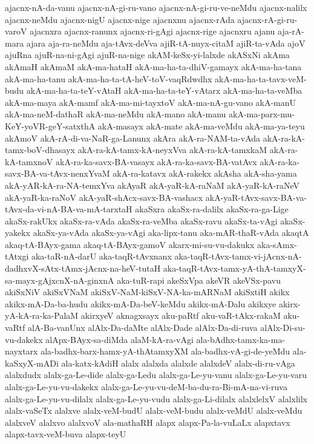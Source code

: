 {ajacnx-nA-da-vanu
ajacnx-nA-gi-ru-vano
ajacnx-nA-gi-ru-ve-neMdu
ajacnx-nalilx
ajacnx-neMdu
ajacnx-nigU
ajacnx-nige
ajacnxnu
ajacnx-rAda
ajacnx-rA-gi-ru-varoV
ajacnxra
ajacnx-ranunx
ajacnx-ri-gAgi
ajacnx-rige
ajacnxru
ajanu
aja-rA-mara
ajara
aja-ra-neMdu
aja-tAvx-deVva
ajiR-tA-nuyx-citaM
ajiR-ta-vAda
ajoV
ajuRna
ajuR-na-ni-gAgi
ajuR-na-nige
akAM-keSx-yi-lalxde
akASxNi
akAma
akAmaH
akAmaM
akA-ma-hataH
akA-ma-ha-ta-dhiV-gamayx
akA-ma-ha-tana
akA-ma-ha-tanu
akA-ma-ha-ta-tA-heV-toV-vaqRdwdhx
akA-ma-ha-ta-tavx-veM-budu
akA-ma-ha-ta-teY-vAtaH
akA-ma-ha-ta-teY-vAtarx
akA-ma-ha-ta-veMba
akA-ma-maya
akA-mamf
akA-ma-mi-tayxtoV
akA-ma-nA-gu-vano
akA-manU
akA-ma-neM-dathaR
akA-ma-neMdu
akA-mano
akA-manu
akA-ma-parx-mu-KeY-yoVR-geY-satxthA
akA-masayx
akA-mate
akA-ma-veMdu
akA-ma-ya-teyu
akAmoV
akA-rA-di-va-NaR-ga-Lanunx
akAra
akA-ra-NAM-ta-vAda
akA-ra-kA-tamx-boV-dhasayx
akA-ra-kA-tamx-kA-neyxVva
akA-ra-kA-tamxkaM
akA-ra-kA-tamxnoV
akA-ra-ka-savx-BA-vasayx
akA-ra-ka-savx-BA-vatAvx
akA-ra-ka-savx-BA-va-tAvx-nenxYvaM
akA-ra-katavx
akA-rakekx
akAsha
akA-sha-yama
akA-yAR-kA-ra-NA-temxYva
akAyaR
akA-yaR-kA-raNaM
akA-yaR-kA-raNeV
akA-yaR-ka-raNoV
akA-yaR-shAcx-savx-BA-vashacx
akA-yaR-tAvx-savx-BA-va-tAvx-da-vi-nA-BA-va-mA-tarxtaH
akaSxra
akaSx-ra-dalilx
akaSx-ra-ga-Lige
akaSx-rakUkx
akaSx-ra-vAda
akaSx-ra-veMba
akaSx-ravu
akaSx-ta-vAgi
akaSx-yakekx
akaSx-ya-vAda
akaSx-ya-vAgi
aka-lipx-tanu
aka-mAR-thaR-vAda
akaqtA
akaq-tA-BAyx-gama
akaq-tA-BAyx-gamoV
akarx-mi-su-vu-dakukx
aka-sAmx-tAtxgi
aka-taR-nA-darU
aka-taqR-tAvxnanx
aka-taqR-tAvx-tamx-vi-jAcnx-nA-dadhxvX-sAtx-tAmx-jAcnx-na-heV-tutaH
aka-taqR-tAvx-tamx-yA-thA-tamxyX-sa-mayx-gAjxcnX-nA-ginxnA
aka-tuR-rapi
akeSxVpa
akeVR
akeVSx-pavu
akiSxNiV
akiSxVNaM
akiSxV-NaM-kiSxV-NA-ka-mARNaM
akiSxtiH
akikx
akikx-mA-Da-ba-hudu
akikx-mA-Da-beV-keMdu
akikx-mA-Dalu
akikxye
akirx-yA-kA-ra-ka-PalaM
akirxyeV
aknagxsayx
aku-paRtf
aku-vaR-tAkx-rakaM
aku-vaRtf
alA-Ba-vanUnx
alAlx-Da-daMte
alAlx-Dade
alAlx-Da-di-ruva
alAlx-Di-su-vu-dakekx
alApx-BAyx-sa-diMda
alaM-kA-ra-vAgi
ala-bAdhx-tamx-ka-ma-nayxtarx
ala-badhx-barx-hamx-yA-thAtamxyXM
ala-badhx-vA-gi-de-yeMdu
ala-kaSxyX-mADi
ala-katx-kAdiH
alalx
alalxda
alalxde
alalxdeV
alalx-di-ru-vAga
alalxdudx
alalx-ga-Le-dide
alalx-ga-Ledu
alalx-ga-Le-yu-vanu
alalx-ga-Le-yu-varu
alalx-ga-Le-yu-vu-dakekx
alalx-ga-Le-yu-vu-deM-ba-du-ra-Bi-mA-na-vi-ruva
alalx-ga-Le-yu-vu-dilalx
alalx-ga-Le-yu-vudu
alalx-ga-Li-dilalx
alalxlelxV
alalxlilx
alalx-vaSeTx
alalxve
alalx-veM-budU
alalx-veM-budu
alalx-veMdU
alalx-veMdu
alalxveV
alalxvo
alalxvoV
ala-mathaRH
alapx
alapx-Pa-la-vuLaLx
alapxtavx
alapx-tavx-veM-buva
alapx-teyU
}
